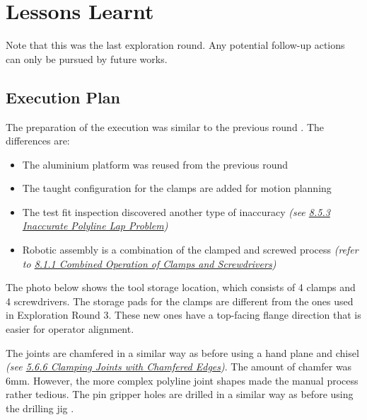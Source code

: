 

\section{Lessons Learnt}
\label{section:exploration-5-lessons-learnt}

Note that this was the last exploration round. Any potential follow-up actions can only be pursued by future works.

\subsection{Execution Plan}
\label{subsection:exploration-5-execution-plan}

The preparation of the execution was similar to the previous round . The differences are:

\begin{itemize}
	\item The aluminium platform was reused from the previous round

	\item The taught configuration for the clamps are added for motion planning

	\item The test fit inspection discovered another type of inaccuracy \textit{(see \ul{8.5.3 Inaccurate Polyline Lap Problem})}

	\item Robotic assembly is a combination of the clamped and screwed process \textit{(refer to \ul{8.1.1 Combined Operation of Clamps and Screwdrivers})}

\end{itemize}
The photo below shows the tool storage location, which consists of 4 clamps and 4 screwdrivers. The storage pads for the clamps are different from the ones used in Exploration Round 3. These new ones have a top-facing flange direction that is easier for operator alignment.




The joints are chamfered in a similar way as before using a hand plane and chisel \textit{(see \ul{5.6.6 Clamping Joints with Chamfered Edges})}. The amount of chamfer was 6mm. However, the more complex polyline joint shapes made the manual process rather tedious. The pin gripper holes are drilled in a similar way as before using the drilling jig .

